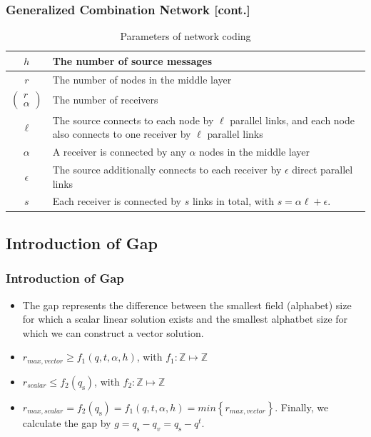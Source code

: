 \documentclass[c]{beamer}
\begin{document}
\begin{frame}[c]
\frametitle{Generalized Combination Network [cont.]}

\begin{table}[H]
\caption{Parameters of network coding \label{tab:Parameters-of-network}}

\centering{}%
\begin{tabular}{c|>{\centering}p{0.60\paperwidth}}
$h$ & The number of source messages\tabularnewline
\hline 
$r$ & The number of nodes in the middle layer\tabularnewline
\hline 
$\left(\begin{array}{c}
r\\
\alpha
\end{array}\right)$ & The number of receivers\tabularnewline
\hline 
$\ell$ & The source connects to each node by $\ell$ parallel links, and each
node also connects to one receiver by $\ell$ parallel links\tabularnewline
\hline 
$\alpha$ & A receiver is connected by any $\alpha$ nodes in the middle layer\tabularnewline
\hline 
$\epsilon$ & The source additionally connects to each receiver by $\epsilon$ direct
parallel links\tabularnewline
\hline 
$s$ & Each receiver is connected by $s$ links in total, with $s=\alpha\ell+\epsilon$.\tabularnewline
\end{tabular}
\end{table}


\end{frame}

\subsection{Introduction of Gap}
\begin{frame}[c]
\frametitle{Introduction of Gap}

	\begin{itemize}
		\item The gap represents the difference between the smallest field (alphabet) size for which a scalar linear solution exists and the smallest alphatbet size for which we can construct a vector solution.	
		\item $r_{max,vector}\geq f_{1}(q,t,\alpha,h)$, with $f_{1}:\mathbb{Z}\mapsto\mathbb{Z}$
		\item $r_{scalar}\leq f_{2}\left(q_{\mathrm{s}}\right)$,
with $f_{2}:\mathbb{Z}\mapsto\mathbb{Z}$
		\item $r_{max,scalar}=f_{2}\left(q_{\mathrm{s}}\right)=f_{1}(q,t,\alpha,h)=min\left\{r_{max,vector}\right\}$.
Finally, we calculate the gap by $g=q_{\mathrm{s}}-q_{v}=q_{\mathrm{s}}-q^{t}.$
		
	\end{itemize}

\end{frame}
\end{document}
